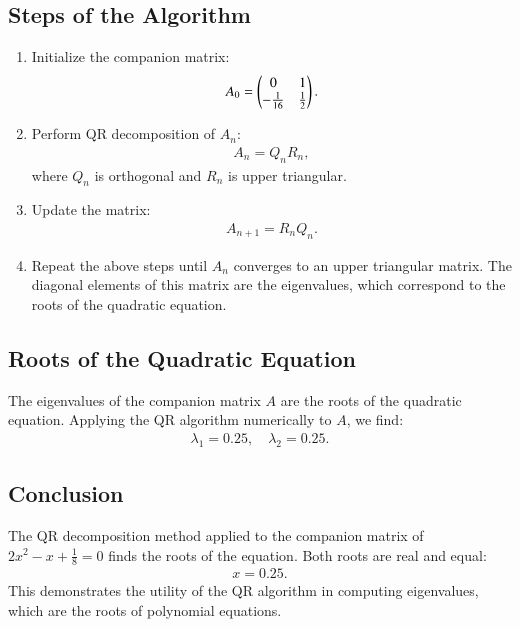 \documentclass[journal]{IEEEtran}
\begin{document}
\begin{enumerate}
\subsection*{Steps of the Algorithm}
\begin{enumerate}
    \item Initialize the companion matrix:
    \begin{align}
        A_0 = 
        \begin{pmatrix}
            0 & 1 \\
            -\frac{1}{16} & \frac{1}{2}
        \end{pmatrix}.
    \end{align}
    \item Perform QR decomposition of $A_n$:
    \begin{align}
        A_n = Q_n R_n,
    \end{align}
    where $Q_n$ is orthogonal and $R_n$ is upper triangular.
    \item Update the matrix:
    \begin{align}
        A_{n+1} = R_n Q_n.
    \end{align}
    \item Repeat the above steps until $A_n$ converges to an upper triangular matrix. The diagonal elements of this matrix are the eigenvalues, which correspond to the roots of the quadratic equation.
\end{enumerate}

\subsection*{Roots of the Quadratic Equation}
The eigenvalues of the companion matrix $A$ are the roots of the quadratic equation. Applying the QR algorithm numerically to $A$, we find:
\begin{align}
    \lambda_1 = 0.25, \quad \lambda_2 = 0.25.
\end{align}

\subsection*{Conclusion}
The QR decomposition method applied to the companion matrix of $2x^2 - x + \frac{1}{8} = 0$ finds the roots of the equation. Both roots are real and equal:
\begin{align}
    x = 0.25.
\end{align}
This demonstrates the utility of the QR algorithm in computing eigenvalues, which are the roots of polynomial equations.



\end{enumerate}
\end{document}
